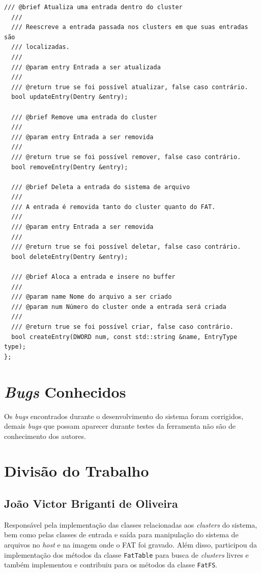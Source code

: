 \documentclass[
    12pt,				%
    oneside,   	        %
    a4paper,			%
    english,			%
    french,				%
    spanish,			%
    brazil,				%
    ]{pacotes/abntex2}
\begin{document}
\begin{lstlisting}[caption={Classe de abstração dos clusters do sistema}, label={lst:cluster_io}]
  /// @brief Atualiza uma entrada dentro do cluster
  ///
  /// Reescreve a entrada passada nos clusters em que suas entradas são
  /// localizadas.
  ///
  /// @param entry Entrada a ser atualizada
  ///
  /// @return true se foi possível atualizar, false caso contrário.
  bool updateEntry(Dentry &entry);

  /// @brief Remove uma entrada do cluster
  ///
  /// @param entry Entrada a ser removida
  ///
  /// @return true se foi possível remover, false caso contrário.
  bool removeEntry(Dentry &entry);

  /// @brief Deleta a entrada do sistema de arquivo
  ///
  /// A entrada é removida tanto do cluster quanto do FAT.
  ///
  /// @param entry Entrada a ser removida
  ///
  /// @return true se foi possível deletar, false caso contrário.
  bool deleteEntry(Dentry &entry);

  /// @brief Aloca a entrada e insere no buffer
  /// 
  /// @param name Nome do arquivo a ser criado
  /// @param num Número do cluster onde a entrada será criada
  /// 
  /// @return true se foi possível criar, false caso contrário.
  bool createEntry(DWORD num, const std::string &name, EntryType type);
};
\end{lstlisting}

\section{\textit{Bugs} Conhecidos}
\label{sec:bugs}

Os \textit{bugs} encontrados durante o desenvolvimento do sistema foram corrigidos, demais \textit{bugs} que possam aparecer durante testes da ferramenta não são de conhecimento dos autores.

\section{Divisão do Trabalho}
\label{sec:trabalhadores_univos}

\subsection{João Victor Briganti de Oliveira}
\label{subsec:joao}

Responsável pela implementação das classes relacionadas aos \textit{clusters} do sistema, bem como pelas classes de entrada e saída para manipulação do sistema de arquivos no \textit{host} e na imagem onde o FAT foi gravado. Além disso, participou da implementação dos métodos da classe \texttt{FatTable} para busca de \textit{clusters} livres e também implementou e contribuiu para os métodos da classe \texttt{FatFS}.
\end{document}
